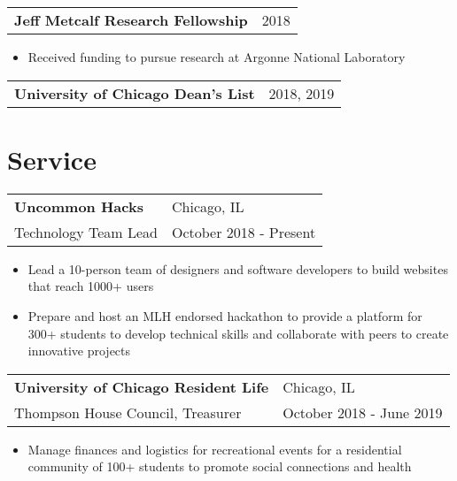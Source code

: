 \documentclass[letterpaper, 12pt]{article}
\begin{document}
\begin{tabular}{@{} L{12cm} @{} R{4.51cm} @{}}
  \textbf{Jeff Metcalf Research Fellowship} & 2018 \\
\end{tabular}
\vspace{-20pt}
\begin{itemize}
  \item Received funding to pursue research at Argonne National Laboratory
\end{itemize}

\begin{tabular}{@{} L{12cm} @{} R{4.51cm} @{}}
  \textbf{University of Chicago Dean's List} & 2018, 2019 \\
\end{tabular}
\vspace{5pt}


\section{Service}
\vspace{5pt}
\begin{tabular}{@{} L{12cm} @{} R{4.51cm} @{}}
  \textbf{Uncommon Hacks} & Chicago, IL \\
  Technology Team Lead & October 2018 - Present \\
\end{tabular}
\vspace{-10pt}
\begin{itemize}
  \item Lead a 10-person team of designers and software developers to build websites that reach 1000+ users
  \item Prepare and host an MLH endorsed hackathon to provide a platform for 300+ students to develop technical skills and collaborate with peers to create innovative projects
\end{itemize}

\begin{tabular}{@{} L{11cm} @{} R{5.51cm} @{}}
  \textbf{University of Chicago Resident Life} & Chicago, IL \\
  Thompson House Council, Treasurer & October 2018 - June 2019 \\
\end{tabular}
\vspace{-10pt}
\begin{itemize}
  \item Manage finances and logistics for recreational events for a residential community of 100+ students to promote social connections and health
\end{itemize}
\end{document}
